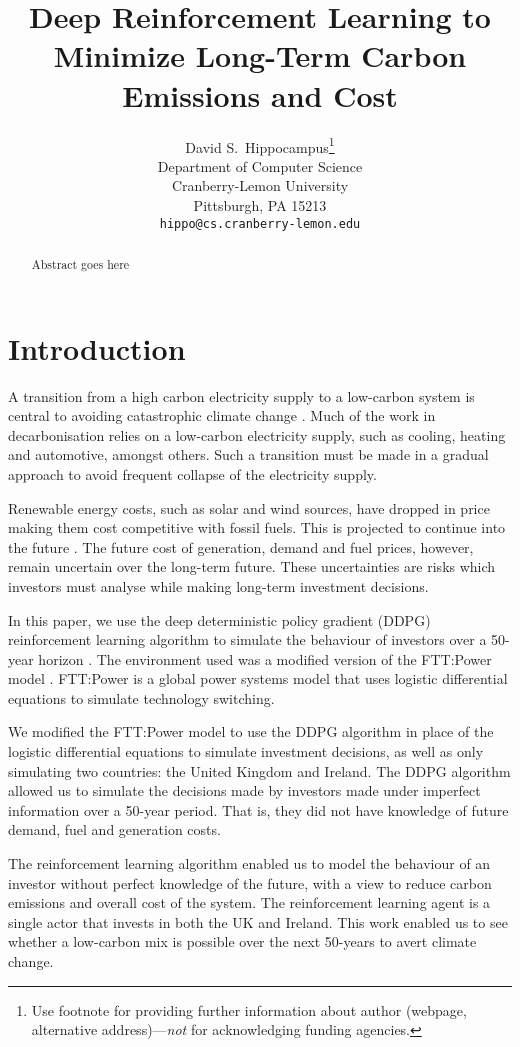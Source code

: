 \documentclass{article}
\title{Deep Reinforcement Learning to Minimize Long-Term Carbon Emissions and Cost}
\author{%
  David S.~Hippocampus\thanks{Use footnote for providing further information
    about author (webpage, alternative address)---\emph{not} for acknowledging
    funding agencies.} \\
  Department of Computer Science\\
  Cranberry-Lemon University\\
  Pittsburgh, PA 15213 \\
  \texttt{hippo@cs.cranberry-lemon.edu} \\
}
\begin{document}
\maketitle

\begin{abstract}
Abstract goes here
\end{abstract}




\section{Introduction}
\label{sec:intro}


A transition from a high carbon electricity supply to a low-carbon system is central to avoiding catastrophic climate change \cite{Kell2020}. Much of the work in decarbonisation relies on a low-carbon electricity supply, such as cooling, heating and automotive, amongst others. Such a transition must be made in a gradual approach to avoid frequent collapse of the electricity supply.

Renewable energy costs, such as solar and wind sources, have dropped in price making them cost competitive with fossil fuels. This is projected to continue into the future \cite{IEA2015}. The future cost of generation, demand and fuel prices, however, remain uncertain over the long-term future. These uncertainties are risks which investors must analyse while making long-term investment decisions.

In this paper, we use the deep deterministic policy gradient (DDPG) reinforcement learning algorithm to simulate the behaviour of investors over a 50-year horizon \cite{Hunt2016a}. The environment used was a modified version of the FTT:Power model \cite{Mercure2012}. FTT:Power is a global power systems model that uses logistic differential equations to simulate technology switching. 

We modified the FTT:Power model to use the DDPG algorithm in place of the logistic differential equations to simulate investment decisions, as well as only simulating two countries: the United Kingdom and Ireland. The DDPG algorithm allowed us to simulate the decisions made by investors made under imperfect information over a 50-year period. That is, they did not have knowledge of future demand, fuel and generation costs. 

The reinforcement learning algorithm enabled us to model the behaviour of an investor without perfect knowledge of the future, with a view to reduce carbon emissions and overall cost of the system. The reinforcement learning agent is a single actor that invests in both the UK and Ireland. This work enabled us to see whether a low-carbon mix is possible over the next 50-years to avert climate change.
\end{document}
